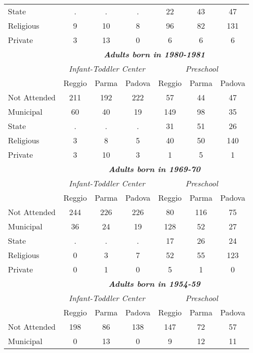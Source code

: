\begin{table}[ht]
\begin{center}
\begin{tabular}{l ccc|ccc}
State           &   . &   . &   . &  22 &  43 &  47 \\ 
Religious       &   9 &  10 &   8 &  96 &  82 & 131 \\ 
Private         &   3 &  13 &   0 &   6 &   6 &   6 \\ \hline
%
%
\rule{0pt}{1.2\normalbaselineskip}
 & \multicolumn{6}{c}{\textit{\textbf{Adults born in 1980-1981}}} \\ 
 & \multicolumn{3}{c}{\textit{Infant-Toddler Center}} & \multicolumn{3}{c}{\textit{Preschool}} \\ 
 & Reggio & Parma & Padova & Reggio & Parma & Padova \\ \hline
Not Attended    & 211 & 192 & 222 &  57 &  44 &  47 \\ 
Municipal       & 60  &  40 &  19 & 149 &  98 &  35 \\ 
State           &   . &   . &   . &  31 &  51 &  26 \\ 
Religious       &   3 &   8 &   5 &  40 &  50 & 140 \\ 
Private         &   3 &  10 &   3 &   1 &   5 &   1 \\ \hline
%
%
\rule{0pt}{1.2\normalbaselineskip}
 & \multicolumn{6}{c}{\textit{\textbf{Adults born in 1969-70}}} \\ 
 & \multicolumn{3}{c}{\textit{Infant-Toddler Center}} & \multicolumn{3}{c}{\textit{Preschool}} \\ 
 & Reggio & Parma & Padova & Reggio & Parma & Padova \\ \hline
Not Attended    & 244 & 226 & 226 &  80 & 116 &  75 \\ 
Municipal       & 36  &  24 &  19 & 128 &  52 &  27 \\ 
State           &   . &   . &   . &  17 &  26 &  24 \\ 
Religious       &   0 &   3 &   7 &  52 &  55 & 123 \\ 
Private         &   0 &   1 &   0 &   5 &   1 &   0 \\ \hline
%
%
\rule{0pt}{1.2\normalbaselineskip}
 & \multicolumn{6}{c}{\textit{\textbf{Adults born in 1954-59}}} \\ 
 & \multicolumn{3}{c}{\textit{Infant-Toddler Center}} & \multicolumn{3}{c}{\textit{Preschool}} \\ 
 & Reggio & Parma & Padova & Reggio & Parma & Padova \\ \hline
Not Attended    & 198 &  86 & 138 & 147 &  72 &  57 \\ 
Municipal       &  0  &  13 &   0 &   9 &  12 &  11 \\ 

\end{tabular}
\end{center}
\end{table}
